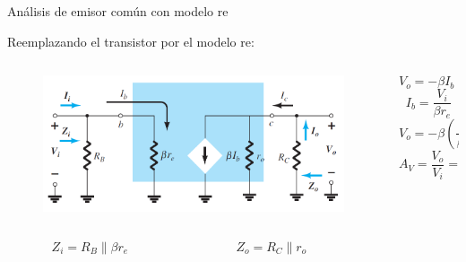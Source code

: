 \documentclass[t,aspectratio=169]{beamer}
\begin{document}
\begin{frame}{Análisis de emisor común con modelo re}

Reemplazando el transistor por el modelo re:

\begin{columns}
\begin{column}{0.6\textwidth}
\begin{figure}[H]
    \centering
    \includegraphics[width=\textwidth]{figuras/analisis_re_ec_3.png}
\end{figure}
\end{column}
\begin{column}{0.4\textwidth}
\[ V_o = -\beta I_b (R_C \parallel r_o) \]
\[ I_b = \dfrac{V_i}{\beta r_e} \]
\[ V_o = -\beta \left( \dfrac{V_i}{\beta r_e} \right) (R_C \parallel r_o) \]
\[ \boxed{A_V = \dfrac{V_o}{V_i} = -\dfrac{(R_C \parallel r_o)}{r_e} } \]
\end{column}
\end{columns}

\begin{columns}
\begin{column}{0.3\textwidth}
\[ \boxed{Z_i = R_B \parallel \beta r_e} \]
\end{column}
\begin{column}{0.3\textwidth}
\[ \boxed{Z_o = R_C \parallel r_o} \]
\end{column}
\begin{column}{0.4\textwidth}
\end{column}
\end{columns}

\end{frame}
\end{document}
